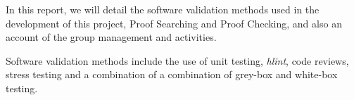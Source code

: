 In this report, we will detail the software validation methods used in the development of this project, Proof Searching and Proof Checking, and also an account of the group management and activities.

Software validation methods include the use of unit testing, \emph{hlint}, code reviews, stress testing and a combination of a combination of grey-box and white-box testing.